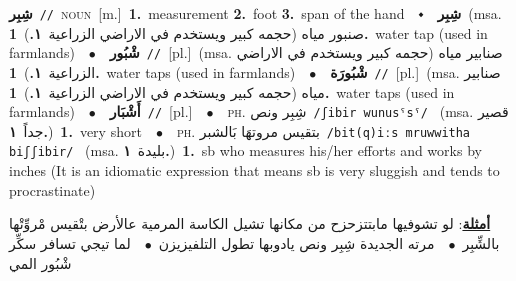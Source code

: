 \documentclass[10pt,a4paper,twoside]{article} %
\begin{document}
\begin{multicols}{2}
{{{{{{\setlength\topsep{0pt}\textbf{\foreignlanguage{arabic}{شِبِر}}\ {\color{gray}\texttt{//}\color{black}}\ \textsc{noun}\ [m.]\ \textbf{1.}~measurement  \textbf{2.}~foot  \textbf{3.}~span of the hand\ \ $\smblkdiamond$\ \ \setlength\topsep{0pt}\textbf{\foreignlanguage{arabic}{شِبِر}}\ \color{gray}(msa. \foreignlanguage{arabic}{صنبور مياه (حجمه كبير ويستخدم في الاراضي الزراعية}~\foreignlanguage{arabic}{\textbf{١.}})\color{black}\ \textbf{1.}~water tap (used in farmlands)\ \ $\bullet$\ \ \setlength\topsep{0pt}\textbf{\foreignlanguage{arabic}{شْبُور}}\ {\color{gray}\texttt{//}\color{black}}\ [pl.]\ \color{gray}(msa. \foreignlanguage{arabic}{صنابير مياه (حجمه كبير ويستخدم في الاراضي الزراعية}~\foreignlanguage{arabic}{\textbf{١.}})\color{black}\ \textbf{1.}~water taps (used in farmlands)\ \ $\bullet$\ \ \setlength\topsep{0pt}\textbf{\foreignlanguage{arabic}{شْبُورَة}}\ {\color{gray}\texttt{//}\color{black}}\ [pl.]\ \color{gray}(msa. \foreignlanguage{arabic}{صنابير مياه (حجمه كبير ويستخدم في الاراضي الزراعية}~\foreignlanguage{arabic}{\textbf{١.}})\color{black}\ \textbf{1.}~water taps (used in farmlands)\ \ $\bullet$\ \ \setlength\topsep{0pt}\textbf{\foreignlanguage{arabic}{أَشْبَار}}\ {\color{gray}\texttt{//}\color{black}}\ [pl.]\ \ $\bullet$\ \ \textsc{ph.} \color{gray} \foreignlanguage{arabic}{شِبِر ونص}\color{black}\ {\color{gray}\texttt{/{\sffamily ʃibir wunusˤsˤ}/}\color{black}}\ \color{gray} (msa. \foreignlanguage{arabic}{قصير جداً}~\foreignlanguage{arabic}{\textbf{١.}})\color{black}\ \textbf{1.}~very short\ \ $\bullet$\ \ \textsc{ph.} \color{gray} \foreignlanguage{arabic}{بتقيس مروتهَا بَالشبر}\color{black}\ {\color{gray}\texttt{/{\sffamily bit(q)iːs mruwwitha biʃʃibir}/}\color{black}}\ \color{gray} (msa. \foreignlanguage{arabic}{بليدة}~\foreignlanguage{arabic}{\textbf{١.}})\color{black}\ \textbf{1.}~sb who measures his/her efforts and works by inches (It is an idiomatic expression that means sb is very sluggish and tends to procrastinate)\  \begin{flushright}\color{gray}\foreignlanguage{arabic}{\textbf{\underline{\foreignlanguage{arabic}{أمثلة}}}: لو تشوفيها مابتتزحزح من مكانها تشيل الكاسة المرمية عالأرض بتْقيس مْروِّتْها بالشِّبِر\ $\bullet$\ \  مرته الجديدة شِبِر ونص يادوبها تطول التلفيزيزن\ $\bullet$\ \  لما تيجي تسافر سكِّر شْبُور المي}\end{flushright}\color{black}} \vspace{2mm}

}}}}}
\end{multicols}
\end{document}

